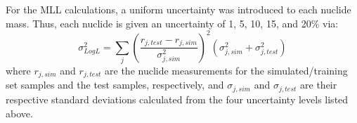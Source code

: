 For the \gls{MLL} calculations, a uniform uncertainty was introduced to each
nuclide mass.  Thus, each nuclide is given an uncertainty of 1, 5, 10, 15, and
20\% via:
\begin{equation}
  \label{eq:mllunc}
  \sigma_{Log L}^2 = \sum_j \left( 
                            \frac{r_{j,test} - r_{j,sim}}{\sigma_{j,sim}^2}
                            \right)^2 
                            (\sigma_{j,sim}^2 + \sigma_{j,test}^2)
\end{equation}
where $r_{j,sim}$ and $r_{j,test}$ are the nuclide measurements for the
simulated/training set samples and the test samples, respectively, and
$\sigma_{j,sim}$ and $\sigma_{j,test}$ are their respective standard deviations
calculated from the four uncertainty levels listed above.  
